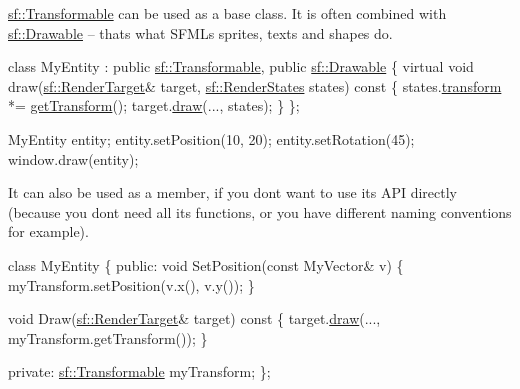 \hyperlink{classsf_1_1_transformable}{sf\+::\+Transformable} can be used as a base class. It is often combined with \hyperlink{classsf_1_1_drawable}{sf\+::\+Drawable} -- that\textquotesingle{}s what S\+F\+ML\textquotesingle{}s sprites, texts and shapes do. 
\begin{DoxyCode}
\textcolor{keyword}{class }MyEntity : \textcolor{keyword}{public} \hyperlink{classsf_1_1_transformable}{sf::Transformable}, \textcolor{keyword}{public} \hyperlink{classsf_1_1_drawable}{sf::Drawable}
\{
    \textcolor{keyword}{virtual} \textcolor{keywordtype}{void} draw(\hyperlink{classsf_1_1_render_target}{sf::RenderTarget}& target, \hyperlink{classsf_1_1_render_states}{sf::RenderStates} states)\textcolor{keyword}{
       const}
\textcolor{keyword}{    }\{
        states.\hyperlink{classsf_1_1_render_states_a1f737981a0f2f0d4bb8dac866a8d1149}{transform} *= \hyperlink{classsf_1_1_transformable_a7f7c3f0bab3f162b13613904fbdbb9ad}{getTransform}();
        target.\hyperlink{classsf_1_1_render_target_a12417a3bcc245c41d957b29583556f39}{draw}(..., states);
    \}
\};

MyEntity entity;
entity.setPosition(10, 20);
entity.setRotation(45);
window.draw(entity);
\end{DoxyCode}


It can also be used as a member, if you don\textquotesingle{}t want to use its A\+PI directly (because you don\textquotesingle{}t need all its functions, or you have different naming conventions for example). 
\begin{DoxyCode}
\textcolor{keyword}{class }MyEntity
\{
\textcolor{keyword}{public}:
    \textcolor{keywordtype}{void} SetPosition(\textcolor{keyword}{const} MyVector& v)
    \{
        myTransform.setPosition(v.x(), v.y());
    \}

    \textcolor{keywordtype}{void} Draw(\hyperlink{classsf_1_1_render_target}{sf::RenderTarget}& target)\textcolor{keyword}{ const}
\textcolor{keyword}{    }\{
        target.\hyperlink{classsf_1_1_render_target_a12417a3bcc245c41d957b29583556f39}{draw}(..., myTransform.getTransform());
    \}

\textcolor{keyword}{private}:
    \hyperlink{classsf_1_1_transformable}{sf::Transformable} myTransform;
\};
\end{DoxyCode}



